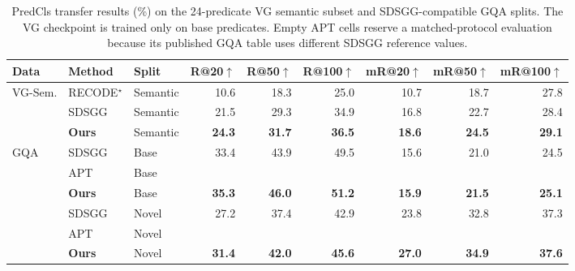 \begin{table}[t]
\centering
\caption{PredCls transfer results (\%) on the 24-predicate VG semantic subset
and SDSGG-compatible GQA splits. The VG checkpoint is trained only on base
predicates. Empty APT cells reserve a matched-protocol evaluation because its
published GQA table uses different SDSGG reference values.}
\label{tab:transfer_analysis}
\scriptsize
\setlength{\tabcolsep}{4.0pt}
\begin{tabular}{lllrrrrrr}
\toprule
Data & Method & Split & R@20$\uparrow$ & R@50$\uparrow$ & R@100$\uparrow$ & mR@20$\uparrow$ & mR@50$\uparrow$ & mR@100$\uparrow$ \\
\midrule
VG-Sem. & RECODE$^{\star}$ \cite{li2023recode} & Semantic & 10.6 & 18.3 & 25.0 & 10.7 & 18.7 & 27.8 \\
 & SDSGG \cite{chen2024sdsgg} & Semantic & 21.5 & 29.3 & 34.9 & 16.8 & 22.7 & 28.4 \\
\rowcolor{blue!6} & \textbf{Ours} & Semantic & \textbf{24.3} & \textbf{31.7} & \textbf{36.5} & \textbf{18.6} & \textbf{24.5} & \textbf{29.1} \\
\midrule
GQA & SDSGG \cite{chen2024sdsgg} & Base & 33.4 & 43.9 & 49.5 & 15.6 & 21.0 & 24.5 \\
 & APT \cite{luo2026apt} & Base & & & & & & \\
\rowcolor{blue!6} & \textbf{Ours} & Base & \textbf{35.3} & \textbf{46.0} & \textbf{51.2} & \textbf{15.9} & \textbf{21.5} & \textbf{25.1} \\
\cmidrule(lr){2-9}
 & SDSGG \cite{chen2024sdsgg} & Novel & 27.2 & 37.4 & 42.9 & 23.8 & 32.8 & 37.3 \\
 & APT \cite{luo2026apt} & Novel & & & & & & \\
\rowcolor{blue!6} & \textbf{Ours} & Novel & \textbf{31.4} & \textbf{42.0} & \textbf{45.6} & \textbf{27.0} & \textbf{34.9} & \textbf{37.6} \\
\bottomrule
\end{tabular}
\end{table}
